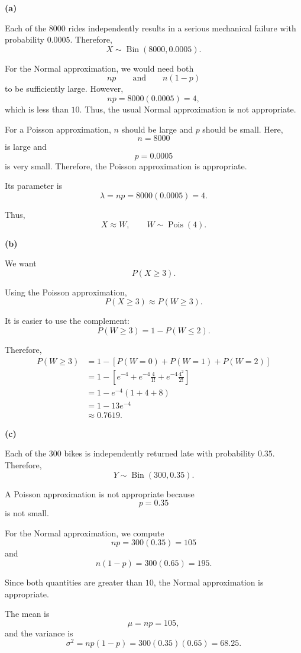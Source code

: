 \documentclass[11pt]{article}
\begin{document}
\begin{solutionbox}

\textbf{(a)}

Each of the \(8000\) rides independently results in a serious mechanical
failure with probability \(0.0005\). Therefore,
\[
X\sim\operatorname{Bin}(8000,0.0005).
\]

For the Normal approximation, we would need both
\[
np
\qquad\text{and}\qquad
n(1-p)
\]
to be sufficiently large. However,
\[
np=8000(0.0005)=4,
\]
which is less than \(10\). Thus, the usual Normal approximation is not
appropriate.

For a Poisson approximation, \(n\) should be large and \(p\) should be
small. Here,
\[
n=8000
\]
is large and
\[
p=0.0005
\]
is very small. Therefore, the Poisson approximation is appropriate.

Its parameter is
\[
\lambda=np=8000(0.0005)=4.
\]

Thus,
\[
X\approx W,
\qquad
W\sim\operatorname{Pois}(4).
\]


\textbf{(b)}

We want
\[
P(X\geq3).
\]

Using the Poisson approximation,
\[
P(X\geq3)
\approx
P(W\geq3).
\]

It is easier to use the complement:
\[
P(W\geq3)
=
1-P(W\leq2).
\]

Therefore,
\begin{align*}
P(W\geq3)
&=
1-\left[
P(W=0)+P(W=1)+P(W=2)
\right]\\
&=
1-\left[
e^{-4}
+
e^{-4}\frac{4}{1!}
+
e^{-4}\frac{4^2}{2!}
\right]\\
&=
1-e^{-4}(1+4+8)\\
&=
1-13e^{-4}\\
&\approx
 {0.7619}.
\end{align*}

 


\textbf{(c)}

Each of the \(300\) bikes is independently returned late with probability
\(0.35\). Therefore,
\[
Y\sim\operatorname{Bin}(300,0.35).
\]

A Poisson approximation is not appropriate because
\[
p=0.35
\]
is not small.

For the Normal approximation, we compute
\[
np=300(0.35)=105
\]
and
\[
n(1-p)=300(0.65)=195.
\]

Since both quantities are greater than \(10\), the Normal approximation is
appropriate.

The mean is
\[
\mu=np=105,
\]
and the variance is
\[
\sigma^2=np(1-p)
=
300(0.35)(0.65)
=
68.25.
\]


\end{solutionbox}
\end{document}
